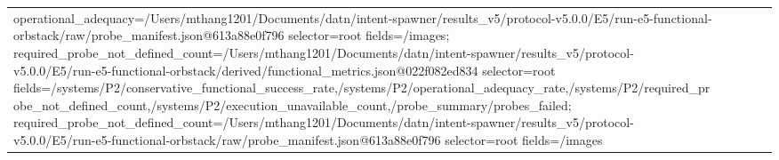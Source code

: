 \begin{tabular}{lllll}
operational\_adequacy=/Users/mthang1201/Documents/datn/intent-spawner/results\_v5/protocol-v5.0.0/E5/run-e5-functional-orbstack/raw/probe\_manifest.json@613a88e0f796 selector=root fields=/images; required\_probe\_not\_defined\_count=/Users/mthang1201/Documents/datn/intent-spawner/results\_v5/protocol-v5.0.0/E5/run-e5-functional-orbstack/derived/functional\_metrics.json@022f082ed834 selector=root fields=/systems/P2/conservative\_functional\_success\_rate,/systems/P2/operational\_adequacy\_rate,/systems/P2/required\_probe\_not\_defined\_count,/systems/P2/execution\_unavailable\_count,/probe\_summary/probes\_failed; required\_probe\_not\_defined\_count=/Users/mthang1201/Documents/datn/intent-spawner/results\_v5/protocol-v5.0.0/E5/run-e5-functional-orbstack/raw/probe\_manifest.json@613a88e0f796 selector=root fields=/images \\

\end{tabular}
